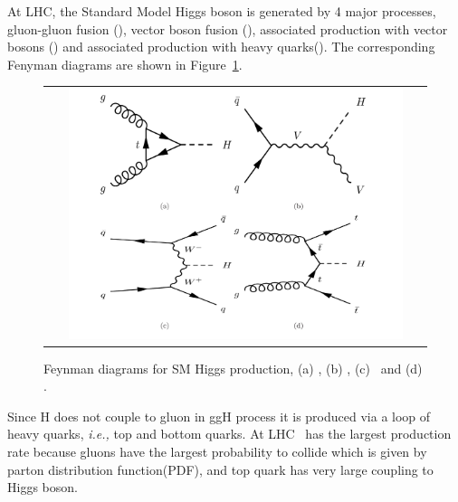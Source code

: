 At LHC, the Standard Model Higgs boson is generated by 4 major processes, 
gluon-gluon fusion (\ggH), 
vector boson fusion (\qqH),
associated production with vector bosons (\qqVH) and 
associated production with heavy quarks(\ttH).
The corresponding Fenyman diagrams are shown in Figure~\ref{fig:FD_HiggsProduction}.
\begin{figure}[htp] 
\centering 
\begin{tabular}{c} 
\includegraphics[width=0.9\textwidth]{figures/FD_HiggsProduction.pdf} 
\end{tabular} 
\caption{Feynman diagrams for SM Higgs production, (a) \ggH, (b) \qqVH, (c) \qqH\ and (d) \ttH.} 
\label{fig:FD_HiggsProduction} 
\end{figure} 
Since H does not couple to gluon in ggH process it is produced via a loop of 
heavy quarks, \textit{i.e.,} top and bottom quarks.
At LHC \ggH\ has the largest production rate because gluons have 
the largest probability to collide which is given by parton distribution function(PDF), 
and top quark has very large coupling to Higgs boson. 
